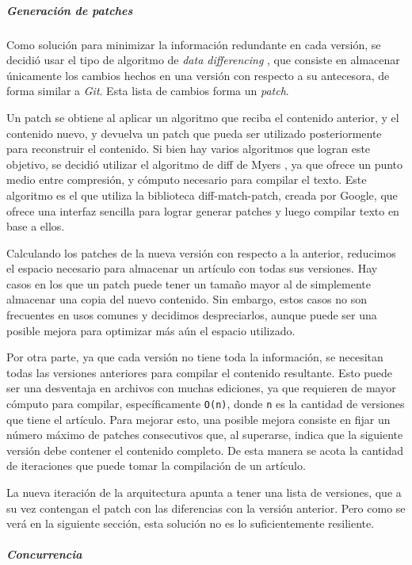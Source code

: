 \subparagraph{Generación de patches}

Como solución para minimizar la información redundante en cada versión, se decidió usar el tipo de algoritmo de \textit{data differencing} \cite{data-differencing}, que consiste en almacenar únicamente los cambios hechos en una versión con respecto a su antecesora, de forma similar a \textit{Git}. Esta lista de cambios forma un \textit{patch}.

Un patch se obtiene al aplicar un algoritmo que reciba el contenido anterior, y el contenido nuevo, y devuelva un patch que pueda ser utilizado posteriormente para reconstruir el contenido. Si bien hay varios algoritmos que logran este objetivo, se decidió utilizar el algoritmo de diff de Myers \cite{myers-diff}, ya que ofrece un punto medio entre compresión, y cómputo necesario para compilar el texto. Este algoritmo es el que utiliza la biblioteca diff-match-patch, creada por Google, que ofrece una interfaz sencilla para lograr generar patches y luego compilar texto en base a ellos.

Calculando los patches de la nueva versión con respecto a la anterior, reducimos el espacio necesario para almacenar un artículo con todas sus versiones.  Hay casos en los que un patch puede tener un tamaño mayor al de simplemente almacenar una copia del nuevo contenido. Sin embargo, estos casos no son frecuentes en usos comunes y decidimos despreciarlos, aunque puede ser una posible mejora para optimizar más aún el espacio utilizado.

Por otra parte, ya que cada versión no tiene toda la información, se necesitan todas las versiones anteriores para compilar el contenido resultante. Esto puede ser una desventaja en archivos con muchas ediciones, ya que requieren de mayor cómputo para compilar, específicamente \texttt{O(n)}, donde \texttt{n} es la cantidad de versiones que tiene el artículo. Para mejorar esto, una posible mejora consiste en fijar un número máximo de patches consecutivos que, al superarse, indica que la siguiente versión debe contener el contenido completo. De esta manera se acota la cantidad de iteraciones que puede tomar la compilación de un artículo.

La nueva iteración de la arquitectura apunta a tener una lista de versiones, que a su vez contengan el patch con las diferencias con la versión anterior. Pero como se verá en la siguiente sección, esta solución no es lo suficientemente resiliente.

\subparagraph{Concurrencia}

